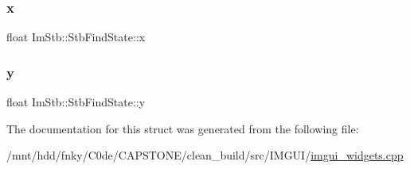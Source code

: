 \mbox{\label{structImStb_1_1StbFindState_a2233226b708f6673b179494a73cfca3d}} 
\subsubsection{\texorpdfstring{x}{x}}
{\footnotesize\ttfamily float Im\+Stb\+::\+Stb\+Find\+State\+::x}

\mbox{\label{structImStb_1_1StbFindState_a7e9bfd008e13aae14cd9cfc7cf9436d1}} 
\subsubsection{\texorpdfstring{y}{y}}
{\footnotesize\ttfamily float Im\+Stb\+::\+Stb\+Find\+State\+::y}



The documentation for this struct was generated from the following file\+:\begin{DoxyCompactItemize}
\item 
/mnt/hdd/fnky/\+C0de/\+C\+A\+P\+S\+T\+O\+N\+E/clean\+\_\+build/src/\+I\+M\+G\+U\+I/\hyperlink{imgui__widgets_8cpp}{imgui\+\_\+widgets.\+cpp}\end{DoxyCompactItemize}
